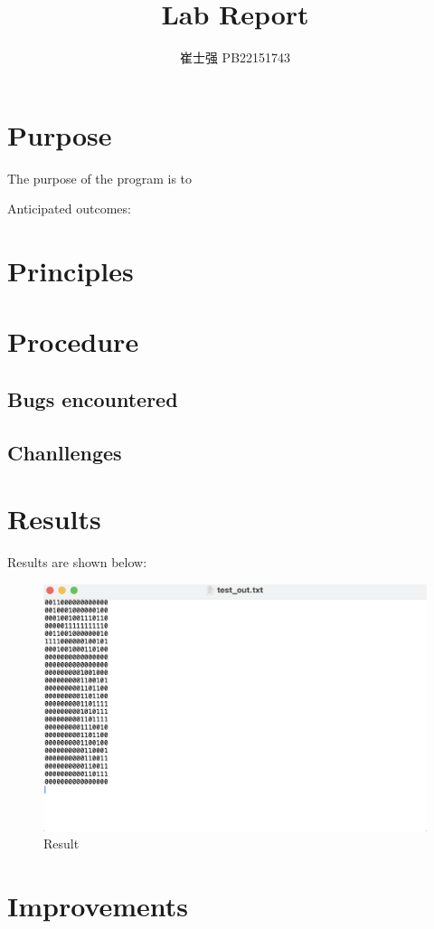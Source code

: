 \documentclass[UTF8]{ctexart}
\title{Lab Report}
\author{崔士强 PB22151743}
\date{}
\begin{document}
\maketitle
\section{Purpose}
The purpose of the program is to 

Anticipated outcomes:

\section{Principles}

\section{Procedure}
\subsection{Bugs encountered}

\subsection{Chanllenges}

\section{Results}
Results are shown below:
\begin{figure}[h]
        \centering
        \includegraphics[scale=0.5]{result.png}
        \caption{Result}
\end{figure}

\section{Improvements}


\end{document}
